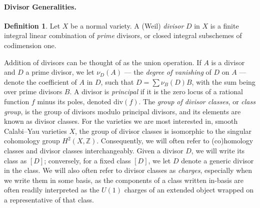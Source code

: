 \documentclass[11pt,dvipsnames]{article}
\theoremstyle{definition}
\newtheorem{definition}[theorem]{Definition}
\begin{document}
\paragraph{Divisor Generalities.} 
\begin{definition}
    Let $X$ be a normal variety. A (Weil) \textit{divisor} $D$ in $X$ is a finite integral linear combination of \textit{prime} divisors, or closed integral subschemes of codimension one.
\end{definition}
Addition of divisors can be thought of as the union operation. If $A$ is a divisor and $D$ a prime divisor, we let $\nu_D(A)$ --- the \textit{degree of vanishing} of $D$ on $A$ --- denote the coefficient of $A$ in $D$, such that $D = \sum \nu_B(D) B$, with the sum being over prime divisors $B$. A divisor is \textit{principal} if it is the zero locus of a rational function $f$ minus its poles, denoted $\mathrm{div}(f)$. The \textit{group of divisor classes}, or \textit{class group}, is the group of divisors modulo principal divisors, and its elements are known as divisor classes. For the varieties we are most interested in, smooth Calabi--Yau varieties $X$, the group of divisor classes is isomorphic to the singular cohomology group $H^2(X, \mathbb{Z})$. Consequently, we will often refer to (co)homology classes and divisor classes interchangeably. Given a divisor $D$, we will write its class as $[D]$; conversely, for a fixed class $[D]$, we let $D$ denote a generic divisor in the class. We will also often refer to divisor classes as \textit{charges}, especially when we write them in some basis, as the components of a class written in-basis are often readily interpreted as the $U(1)$ charges of an extended object wrapped on a representative of that class.
\end{document}
